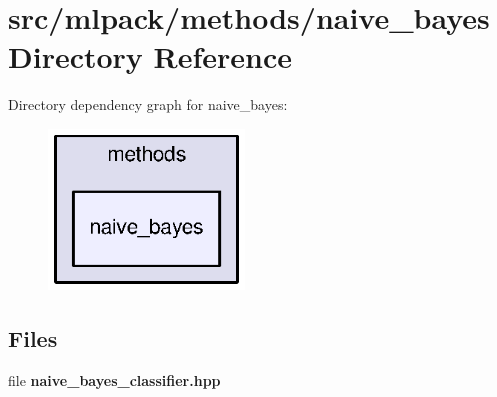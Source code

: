 \section{src/mlpack/methods/naive\+\_\+bayes Directory Reference}
\label{dir_0c9cebbae2836f20c48fc7820984e89e}
Directory dependency graph for naive\+\_\+bayes\+:
\nopagebreak
\begin{figure}[H]
\begin{center}
\leavevmode
\includegraphics[width=148pt]{dir_0c9cebbae2836f20c48fc7820984e89e_dep}
\end{center}
\end{figure}
\subsection*{Files}
\begin{DoxyCompactItemize}
\item 
file {\bf naive\+\_\+bayes\+\_\+classifier.\+hpp}
\end{DoxyCompactItemize}
